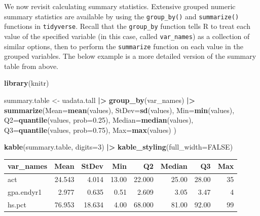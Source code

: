 \documentclass[
]{book}
\newenvironment{Shaded}{\begin{snugshade}}{\end{snugshade}}
\newcommand{\AttributeTok}[1]{\textcolor[rgb]{0.13,0.29,0.53}{#1}}
\newcommand{\ConstantTok}[1]{\textcolor[rgb]{0.56,0.35,0.01}{#1}}
\newcommand{\DecValTok}[1]{\textcolor[rgb]{0.00,0.00,0.81}{#1}}
\newcommand{\FloatTok}[1]{\textcolor[rgb]{0.00,0.00,0.81}{#1}}
\newcommand{\FunctionTok}[1]{\textcolor[rgb]{0.13,0.29,0.53}{\textbf{#1}}}
\newcommand{\NormalTok}[1]{#1}
\newcommand{\OtherTok}[1]{\textcolor[rgb]{0.56,0.35,0.01}{#1}}
\newcommand{\SpecialCharTok}[1]{\textcolor[rgb]{0.81,0.36,0.00}{\textbf{#1}}}
\begin{document}
We now revisit calculating summary statistics.
Extensive grouped numeric summary statistics are available by using the \texttt{group\_by()} and \texttt{summarize()} functions in \texttt{tidyverse}.
Recall that the \texttt{group\_by} function tells R to treat each value of the specified variable (in this case, called \texttt{var\_names}) as a collection of similar options, then to perform the \texttt{summarize} function on each value in the grouped variables.
The below example is a more detailed version of the summary table from above.

\begin{Shaded}
\begin{Highlighting}[]
\FunctionTok{library}\NormalTok{(knitr)}

\NormalTok{summary.table }\OtherTok{\textless{}{-}}\NormalTok{ uadata.tall }\SpecialCharTok{|\textgreater{}}
  \FunctionTok{group\_by}\NormalTok{(var\_names) }\SpecialCharTok{|\textgreater{}}
  \FunctionTok{summarize}\NormalTok{(}\AttributeTok{Mean=}\FunctionTok{mean}\NormalTok{(values),}
            \AttributeTok{StDev=}\FunctionTok{sd}\NormalTok{(values),}
            \AttributeTok{Min=}\FunctionTok{min}\NormalTok{(values),}
            \AttributeTok{Q2=}\FunctionTok{quantile}\NormalTok{(values, }\AttributeTok{prob=}\FloatTok{0.25}\NormalTok{),}
            \AttributeTok{Median=}\FunctionTok{median}\NormalTok{(values),}
            \AttributeTok{Q3=}\FunctionTok{quantile}\NormalTok{(values, }\AttributeTok{prob=}\FloatTok{0.75}\NormalTok{),}
            \AttributeTok{Max=}\FunctionTok{max}\NormalTok{(values) )}

\FunctionTok{kable}\NormalTok{(summary.table, }\AttributeTok{digits=}\DecValTok{3}\NormalTok{) }\SpecialCharTok{|\textgreater{}}
  \FunctionTok{kable\_styling}\NormalTok{(}\AttributeTok{full\_width=}\ConstantTok{FALSE}\NormalTok{)}
\end{Highlighting}
\end{Shaded}

\begin{table}
\centering
\begin{tabular}{l|r|r|r|r|r|r|r}
\hline
var\_names & Mean & StDev & Min & Q2 & Median & Q3 & Max\\
\hline
act & 24.543 & 4.014 & 13.00 & 22.000 & 25.00 & 28.00 & 35\\
\hline
gpa.endyr1 & 2.977 & 0.635 & 0.51 & 2.609 & 3.05 & 3.47 & 4\\
\hline
hs.pct & 76.953 & 18.634 & 4.00 & 68.000 & 81.00 & 92.00 & 99\\
\hline
\end{tabular}
\end{table}
\end{document}
